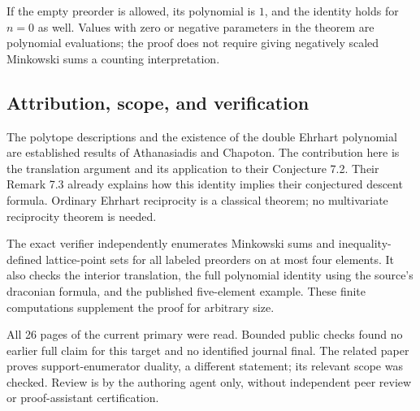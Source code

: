 \documentclass[11pt]{article}
\begin{document}
If the empty preorder is allowed, its polynomial is $1$, and the
identity holds for $n=0$ as well. Values with zero or negative
parameters in the theorem are polynomial evaluations; the proof
does not require giving negatively scaled Minkowski sums a counting
interpretation.

\subsection*{Attribution, scope, and verification}
The polytope descriptions and the existence of the double Ehrhart
polynomial are established results of Athanasiadis and Chapoton.
The contribution here is the translation argument and its application
to their Conjecture 7.2. Their Remark 7.3 already explains how this
identity implies their conjectured descent formula.
Ordinary Ehrhart reciprocity is a classical theorem; no multivariate
reciprocity theorem is needed.

The exact verifier independently enumerates Minkowski sums and
inequality-defined lattice-point sets for all labeled preorders on
at most four elements. It also checks the interior translation, the
full polynomial identity using the source's draconian formula, and
the published five-element example. These finite computations
supplement the proof for arbitrary size.

All 26 pages of the current primary were read. Bounded public
checks found no earlier full claim for this target and no identified
journal final. The related paper \cite{D} proves support-enumerator
duality, a different statement; its relevant scope was checked.
Review is by the authoring agent only, without independent peer
review or proof-assistant certification.
\end{document}
